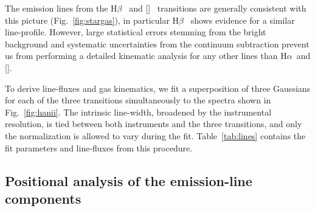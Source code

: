 \documentclass[traditabstract]{aa}
\newcommand{\hb}{H$\beta$}
\newcommand{\ha}{H$\alpha$}
\newcommand{\oiii}{[\ion{O}{iii}]}
\newcommand{\nii}{[\ion{N}{ii}]}
\begin{document}
The emission lines from the \hb~ and \oiii~ transitions are generally consistent with this picture (Fig.~\ref{fig:stargas}), in particular \hb~ shows evidence for a similar line-profile. However, large statistical errors stemming from the bright background and systematic uncertainties from the continuum subtraction prevent us from performing a detailed kinematic analysis for any other lines than \ha~and \nii.

To derive line-fluxes and gas kinematics, we fit a superposition of three Gaussians for each of the three transitions simultaneously to the spectra shown in Fig.~\ref{fig:hanii}. The intrinsic line-width, broadened by the instrumental resolution, is tied between both instruments and the three transitions, and only the normalization is allowed to vary during the fit. Table~\ref{tab:lines} contains the fit parameters and line-fluxes from this procedure.

\subsection{Positional analysis of the emission-line components}
\end{document}
